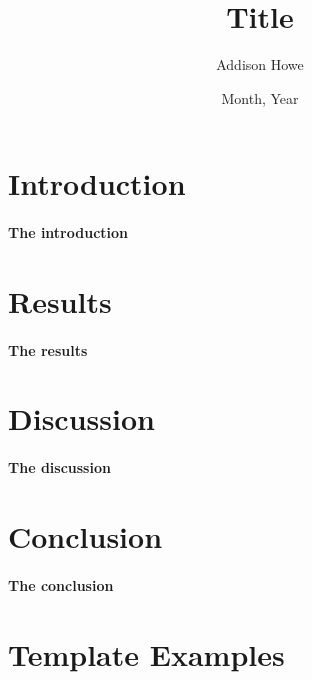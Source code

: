 \documentclass{article}
\title{Title}
\author{Addison Howe}
\date{Month, Year}
\begin{document}
\begin{titlepage}
\maketitle

\lipsum[1]

\end{titlepage}


\section{Introduction}\label{s:introduction}
\paragraph{The introduction} \lipsum[2]

\section{Results}\label{s:results}
\paragraph{The results} \lipsum[3]

\section{Discussion}\label{s:discussion}
\paragraph{The discussion} \lipsum[4]

\section{Conclusion}\label{s:conclusion}
\paragraph{The conclusion} \lipsum[5]


\section{Template Examples}\label{s:examples}
\end{document}

